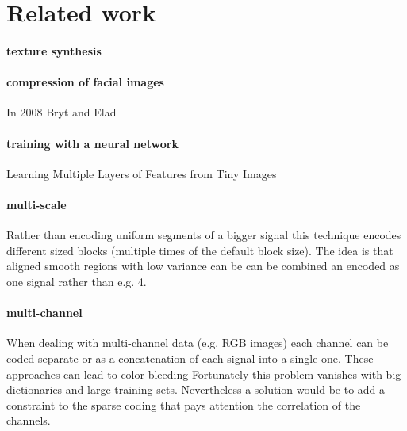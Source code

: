 \section{Related work}




\paragraph{texture synthesis}

\paragraph{compression of facial images}
In 2008 Bryt and Elad \cite{Bryt2008} 

\paragraph{training with a neural network}
Learning Multiple Layers of Features from Tiny Images \cite{Krizhevsky2009}


\paragraph{multi-scale}
Rather than encoding uniform segments of a bigger signal this technique encodes different sized 
blocks (multiple times of the default block size). The idea is that aligned smooth regions with low variance can be 
can be combined an encoded as one signal rather than e.g. 4. \cite{saprio}
\cite{Mairal2007}


\paragraph{multi-channel}
When dealing with multi-channel data (e.g. RGB images) 
each channel can be coded separate or as a concatenation of each signal into a single one.
These approaches can lead to color bleeding \cite{mairal08sparse} 
Fortunately this problem vanishes with big dictionaries and large training sets. \cite{mairal08sparse}
Nevertheless a solution would be to add a constraint to the sparse coding that pays attention the correlation of the channels.

